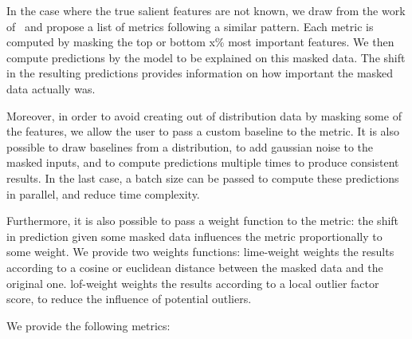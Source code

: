 In the case where the true salient features are not known, we draw from the work
of~\citep{shrikumar2017learning,deyoung2019eraser,crabbe2021explaining} and propose a list of metrics following a
similar pattern.
Each metric is computed by masking the top or bottom x\% most important features.
We then compute predictions by the model to be explained on this masked data.
The shift in the resulting predictions provides information on how important the masked data actually was.

Moreover, in order to avoid creating out of distribution data by masking some of the features, we allow the user to
pass a custom baseline to the metric.
It is also possible to draw baselines from a distribution, to add gaussian noise to the masked inputs, and to compute
predictions multiple times to produce consistent results.
In the last case, a batch size can be passed to compute these predictions in parallel, and reduce time complexity.

Furthermore, it is also possible to pass a weight function to the metric: the shift in prediction given some masked
data influences the metric proportionally to some weight.
We provide two weights functions: lime-weight weights the results according to a cosine or euclidean distance between
the masked data and the original one.
lof-weight weights the results according to a local outlier factor score, to reduce the influence of potential outliers.

We provide the following metrics:

